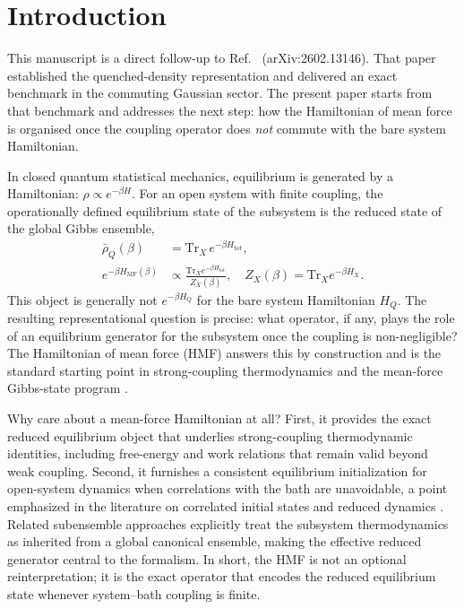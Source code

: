 \section{Introduction}
\label{sec:intro}

This manuscript is a direct follow-up to
Ref.~\cite{mccaulMeanForceHamiltoniansInfluence2026} (arXiv:2602.13146).
That paper established the quenched-density representation and delivered an
exact benchmark in the commuting Gaussian sector. The present paper starts from
that benchmark and addresses the next step: how the Hamiltonian of mean force
is organised once the coupling operator does \emph{not} commute with the bare
system Hamiltonian.

In closed quantum statistical mechanics, equilibrium is generated by a
Hamiltonian: $\rho \propto e^{-\beta H}$. For an open system with finite
coupling, the operationally defined equilibrium state of the subsystem is the
reduced state of the global Gibbs ensemble,
\begin{align}
    \bar{\rho}_Q(\beta) &= \mathrm{Tr}_X\, e^{-\beta H_{\mathrm{tot}}},
    \label{eq:intro_rho_bar} \\
    e^{-\beta H_{\mathrm{MF}}(\beta)}
    &\propto \frac{\mathrm{Tr}_X e^{-\beta H_{\mathrm{tot}}}}{Z_X(\beta)},
    \quad Z_X(\beta)=\mathrm{Tr}_X e^{-\beta H_X}.
    \label{eq:intro_hmf_def}
\end{align}
This object is generally not $e^{-\beta H_Q}$ for the bare system Hamiltonian
$H_Q$. The resulting representational question is precise: what operator, if
any, plays the role of an equilibrium generator for the subsystem once the
coupling is non-negligible? The Hamiltonian of mean force (HMF) answers this by
construction and is the standard starting point in strong-coupling
thermodynamics and the mean-force Gibbs-state program
\cite{campisiFluctuationTheoremArbitrary2009,talknerColloquiumStatisticalMechanics2020,trushechkinOpenQuantumSystem2022,seifertFirstSecondLaw2016,campbellRoadmapQuantumThermodynamics2026,binderThermodynamicsQuantumRegime2018}.

Why care about a mean-force Hamiltonian at all? First, it provides the exact
reduced equilibrium object that underlies strong-coupling thermodynamic
identities, including free-energy and work relations that remain valid beyond
weak coupling\cite{jarzynskiNonequilibriumWorkTheorem2004,campisiFluctuationTheoremArbitrary2009,seifertFirstSecondLaw2016,millerEntropyProduction2017,lacerdaQuantumThermodynamicsFast2023,BinderVinjanampathyModiGoold2015}.
Second, it furnishes a consistent equilibrium initialization for open-system
dynamics when correlations with the bath are unavoidable, a point emphasized in
the literature on correlated initial states and reduced dynamics
\cite{pechukasReducedDynamicsNeed1994b,trushechkinOpenQuantumSystem2022}.
Related subensemble approaches explicitly treat the subsystem thermodynamics as
inherited from a global canonical ensemble, making the effective reduced
generator central to the formalism\cite{gelinThermodynamicsSubensembleCanonical2009a}.
In short, the HMF is not an optional reinterpretation; it is the exact operator
that encodes the reduced equilibrium state whenever system--bath coupling is
finite.

